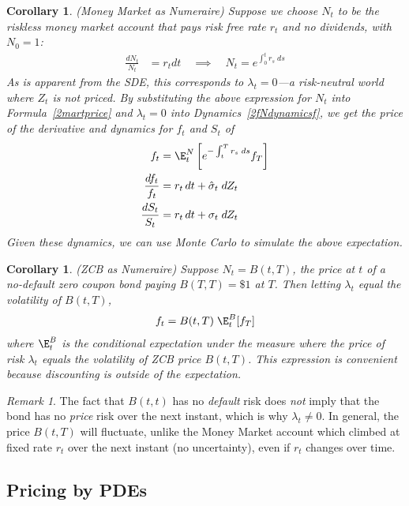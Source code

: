 \documentclass[12pt]{article}
\theoremstyle{plain}
\newtheorem{cor}[thm]{Corollary}
\theoremstyle{definition}
\theoremstyle{remark}
\newtheorem*{rmk}{Remark}
\begin{document}
\begin{cor}\emph{(Money Market as Numeraire)}
Suppose we choose $N_t$ to be the riskless money market account that
pays risk free rate $r_t$ and no dividends, with $N_0=1$:
\begin{align}
  \frac{dN_{t}}{N_{t}}
  &=
  r_t
  dt
  \quad\implies\quad
  N_t=e^{\int_0^t r_s\;ds}
  \label{2dNmoney}
\end{align}
As is apparent from the SDE, this corresponds to $\lambda_t=0$---a
risk-neutral world where $Z_t$ is not priced.
By substituting the above expression for $N_t$ into
Formula~\ref{2martprice} and $\lambda_t=0$ into
Dynamics~\ref{2fNdynamicsf}, we get the price of the derivative and
dynamics for $f_t$ and $S_t$ of
\begin{align*}
  f_t
  &=
  \E_t^{N}
  \left[
  e^{-\int_t^T r_s\;ds}
  f_T
  \right]
  \\
  \frac{df_{t}}{f_{t}}
  &=
  r_t
  \,dt
  +
  \hat{\sigma}_{t}\;dZ_t
  \\
  \frac{dS_{t}}{S_{t}}
  &=
  r_t
  \,dt
  +
  \sigma_{t}\;dZ_t
\end{align*}
Given these dynamics, we can use Monte Carlo to simulate the above
expectation.
\end{cor}

\begin{cor}
\emph{(ZCB as Numeraire)}
Suppose $N_t=B(t,T)$, the price at $t$ of a no-default zero
coupon bond paying $B(T,T)=\$1$ at $T$. Then letting
$\lambda_t$ equal the volatility of $B(t,T)$,
\begin{align*}
  f_t
  =
  B(t,T)
  \;\E_t^B[f_T]
\end{align*}
where $\E^B_t$ is the conditional expectation under the measure where the
price of risk $\lambda_t$ equals the volatility of ZCB price $B(t,T)$.
This expression is convenient because discounting is \emph{outside}
of the expectation.
\end{cor}
\begin{rmk}
The fact that $B(t,t)$ has no \emph{default} risk does \emph{not} imply
that the bond has no \emph{price} risk over the next instant, which is
why $\lambda_t\neq 0$. In general, the price $B(t,T)$ will fluctuate,
unlike the Money Market account which climbed at fixed rate $r_t$ over
the next instant (no uncertainty), even if $r_t$ changes over time.
\end{rmk}



\clearpage
\subsection{Pricing by PDEs}
\end{document}
